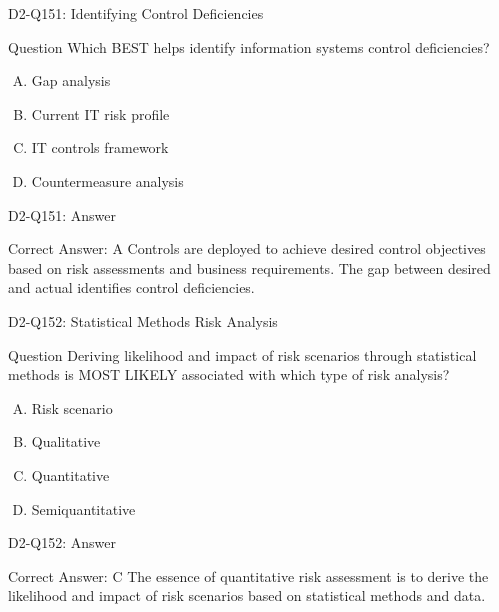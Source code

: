 \documentclass{beamer}
\begin{document}
	\begin{frame}{D2-Q151: Identifying Control Deficiencies}
		\begin{block}{Question}
			Which BEST helps identify information systems control deficiencies?
		\end{block}
		\begin{enumerate}[(A)]
			\item Gap analysis
			\item Current IT risk profile
			\item IT controls framework
			\item Countermeasure analysis
		\end{enumerate}
	\end{frame}
	\begin{frame}{D2-Q151: Answer}
		\begin{block}{Correct Answer: A}
			Controls are deployed to achieve desired control objectives based on risk assessments and business requirements. The gap between desired and actual identifies control deficiencies.
		\end{block}
	\end{frame}
	
	\begin{frame}{D2-Q152: Statistical Methods Risk Analysis}
		\begin{block}{Question}
			Deriving likelihood and impact of risk scenarios through statistical methods is MOST LIKELY associated with which type of risk analysis?
		\end{block}
		\begin{enumerate}[(A)]
			\item Risk scenario
			\item Qualitative
			\item Quantitative
			\item Semiquantitative
		\end{enumerate}
	\end{frame}
	\begin{frame}{D2-Q152: Answer}
		\begin{block}{Correct Answer: C}
			The essence of quantitative risk assessment is to derive the likelihood and impact of risk scenarios based on statistical methods and data.
		\end{block}
	\end{frame}
	
\end{document}
